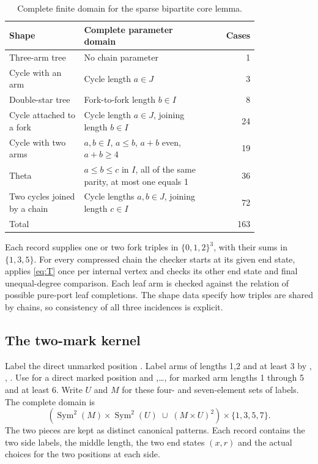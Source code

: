 \begin{table}[H]\centering\small
\begin{tabular}{p{0.30\linewidth}p{0.51\linewidth}r}
\toprule
Shape&Complete parameter domain&Cases\\
\midrule
Three-arm tree&No chain parameter&1\\
Cycle with an arm&Cycle length $a\in J$&3\\
Double-star tree&Fork-to-fork length $b\in I$&8\\
Cycle attached to a fork&Cycle length $a\in J$, joining length $b\in I$&24\\
Cycle with two arms&$a,b\in I$, $a\le b$, $a+b$ even, $a+b\ge4$&19\\
Theta&$a\le b\le c$ in $I$, all of the same parity, at most one equals 1&36\\
Two cycles joined by a chain&Cycle lengths $a,b\in J$, joining length $c\in I$&72\\
\midrule
Total&&163\\
\bottomrule
\end{tabular}
\caption{Complete finite domain for the sparse bipartite core lemma.}
\label{tab:sparse}
\end{table}

Each record supplies one or two fork triples in $\{0,1,2\}^3$, with
their sums in $\{1,3,5\}$.  For every compressed chain the checker
starts at its given end state, applies \eqref{eq:T} once per internal
vertex and checks its other end state and final unequal-degree
comparison.  Each leaf arm is checked against the relation of possible
pure-port leaf completions.  The shape data specify how triples are
shared by chains, so consistency of all three incidences is explicit.

\subsection{The two-mark kernel}

Label the direct unmarked position .  Label arms of lengths
1,2 and at least 3 by , , .
Use  for a direct marked position and
,\ldots, for marked arm lengths 1 through 5 and
at least 6.  Write $U$ and $M$ for these four- and seven-element
sets of labels.  The complete domain is
\begin{equation}\label{eq:kernel}
 \left(\operatorname{Sym}^2(M)\times\operatorname{Sym}^2(U)
       \;\cup\; (M\times U)^2\right)\times\{1,3,5,7\}.
\end{equation}
The two pieces are kept as distinct canonical patterns.  Each record
contains the two side labels, the middle length, the two end states
$(x,r)$ and the actual choices for the two positions at each side.

